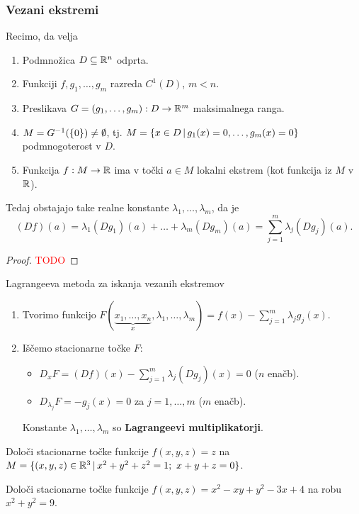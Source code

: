 \subsubsection{Vezani ekstremi}
\begin{izrek}
    Recimo, da velja
    \begin{enumerate}
        \item Podmnožica $D \subseteq \mathbb{R}^n$ odprta.
        \item Funkciji $f, g_1, \ldots, g_m$ razreda $C^1(D)$, $m < n$.
        \item Preslikava $G = (g_1, \ldots, g_m): D \to \mathbb{R}^m$ maksimalnega ranga.
        \item $M = G^{-1}(\{0\}) \neq \emptyset$, tj. $M = \{x \in D \,|\, g_1(x) = 0, \ldots, g_m(x) = 0\}$ podmnogoterost v $D$.
        \item Funkcija $f: M \to \mathbb{R}$ ima v točki $a \in M$ lokalni ekstrem (kot funkcija iz $M$ v $\mathbb{R}$).        
    \end{enumerate}
    Tedaj obstajajo take realne konstante $\lambda_1, \ldots, \lambda_m$, da je 
    $$(Df)(a) = \lambda_1 (Dg_1)(a) + \ldots + \lambda_m (Dg_m)(a) = \sum_{j=1}^{m}\lambda_j(Dg_j)(a).$$ 
\end{izrek}

\begin{proof}
    \textcolor{red}{TODO}
\end{proof}

\begin{opomba}
    Lagrangeeva metoda za iskanja vezanih ekstremov
    \begin{enumerate}
        \item Tvorimo funkcijo $F(\underbrace{x_1, \ldots, x_n}_x, \lambda_1, \ldots, \lambda_m) = f(x) - \sum_{j=1}^{m} \lambda_j g_j(x)$.
        \item Iščemo stacionarne točke $F$:
        \begin{itemize}
            \item $D_xF = (Df)(x) - \sum_{j=1}^{m}\lambda_j(Dg_j)(x) = 0$ ($n$ enačb).
            \item $D_{\lambda_j}F = -g_j(x) = 0$ za $j = 1, \ldots, m$ ($m$ enačb).
        \end{itemize}
        Konstante $\lambda_1, \ldots, \lambda_m$ so \textbf{Lagrangeevi multiplikatorji}.
    \end{enumerate}    
\end{opomba}

\begin{zgled}
    Določi stacionarne točke funkcije $f(x,y,z)=z$ na $M = \{(x,y,z) \in \mathbb{R}^3 \,|\, x^2+y^2+z^2=1; \ x+ y + z = 0\}$.
\end{zgled}

\begin{zgled}
    Določi stacionarne točke funkcije $f(x,y,z)= x^2 - xy +y^2 - 3x +4$ na robu $x^2 + y^2 = 9$.
\end{zgled}